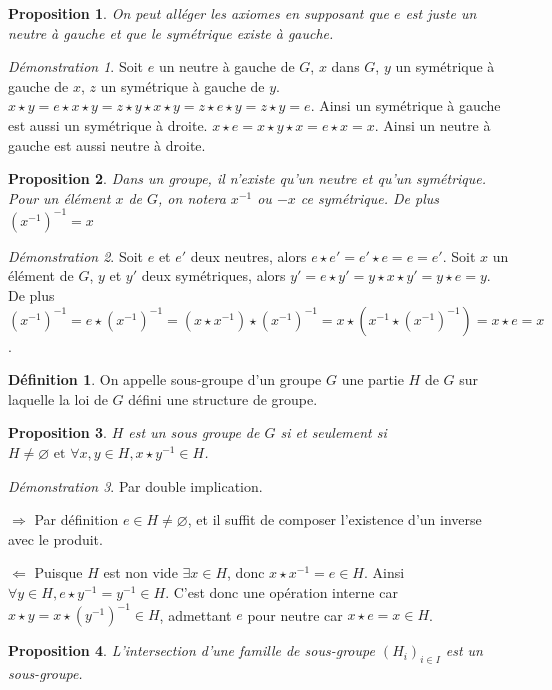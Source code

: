 \documentclass[a4paper, 11pt, french]{book}
\newenvironment{itemise}{\itemize}{\enditemize}
\theoremstyle{plain} %
\newtheorem{proposition}{Proposition}
\theoremstyle{definition} %
\newtheorem{definition}{Définition}
\theoremstyle{remark} %
\newtheorem*{demonstration}{Démonstration}
\newcommand{\1}{\mathds{1}}
\newcommand\vide{\varnothing}
\newcommand{\inv}[1]{#1^{-1}}
\newcommand\et{\text{ et }}
\newcommand\equivalence[3]{
	\begin{demonstration}
		#1
		\begin{itemise}
			\item[$\Longrightarrow$] #2
			\item[$\Longleftarrow$] #3
		\end{itemise}
	\end{demonstration}
}
\begin{document}
\begin{proposition}
	On peut alléger les axiomes en supposant que $e$ est juste un neutre à gauche et que le symétrique existe à gauche.
\end{proposition}

\begin{demonstration}
	Soit $e$ un neutre à gauche de $G$, $x$ dans $G$, $y$ un symétrique à gauche de $x$, $z$ un symétrique à gauche de $y$.
	$x\star y=e\star x\star y=z\star y\star x\star y=z\star e\star y=z\star y=e$.
	Ainsi un symétrique à gauche est aussi un symétrique à droite.
	$x\star e=x\star y\star x=e\star x=x$.
	Ainsi un neutre à gauche est aussi neutre à droite.
\end{demonstration}

\begin{proposition}
	Dans un groupe, il n'existe qu'un neutre et qu'un symétrique.
	Pour un élément $x$ de $G$, on notera $ x^{-1}$ ou $-x$ ce symétrique.
	De plus $\inv{(x^{-1})}=x$
\end{proposition}

\begin{demonstration}
	Soit $e$ et $e'$ deux neutres, alors $e\star e'=e'\star e=e=e'$.
	Soit $x$ un élément de $G$, $y$ et $y'$ deux symétriques, alors $y'=e\star y'=y\star x\star y'=y\star e=y$.
	De plus $(x^{-1})^{-1}=e\star(x^{-1})^{-1}=(x\star x^{-1})\star(x^{-1})^{-1}=x\star(x^{-1}\star(x^{-1})^{-1})=x\star e=x$.
\end{demonstration}

\begin{definition}
	On appelle sous-groupe d'un groupe $G$ une partie $H$ de $G$ sur laquelle la loi de $G$ défini une structure de groupe.
\end{definition}

\begin{proposition}
	$H$ est un sous groupe de $G$ si et seulement si $H\neq\vide\et\forall x, y\in H, x\star\inv{y}\in H$.
\end{proposition}

\equivalence{Par double implication.}
{
	Par définition $e\in H\neq\vide$, et il suffit de composer l'existence d'un inverse avec le produit.
}{
	Puisque $H$ est non vide $\exists x\in H$, donc $x\star x^{-1}=e\in H$.
	Ainsi $\forall y\in H, e\star\inv{y}=\inv{y}\in H$.
	C'est donc une opération interne car $x\star y=x\star\inv{(\inv{y})}\in H$, admettant $e$ pour neutre car $x\star e=x\in H$.
}

\begin{proposition}
	L'intersection d'une famille de sous-groupe $(H_i)_{i\in I}$ est un sous-groupe.
\end{proposition}
\end{document}
